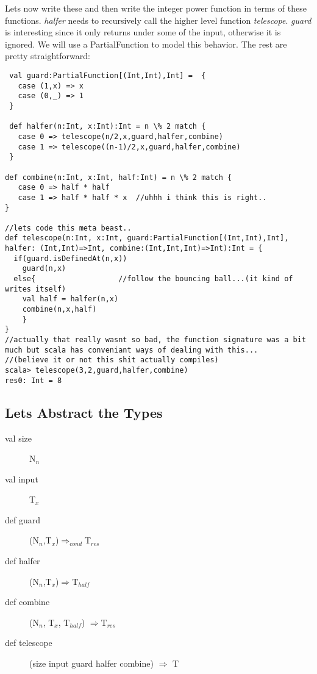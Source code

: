 \documentclass[12pt]{article}
\begin{document}
Lets now write these and then write the integer power function in terms of these functions. \textit{halfer} needs to recursively call the higher level function \textit{telescope}.
\textit{guard} is interesting since it only returns under some of the input, otherwise it is ignored. We will use a PartialFunction to model this behavior. The rest are pretty straightforward:
\begin{lstlisting}
 val guard:PartialFunction[(Int,Int),Int] =  {
   case (1,x) => x
   case (0,_) => 1
 }

 def halfer(n:Int, x:Int):Int = n \% 2 match {
   case 0 => telescope(n/2,x,guard,halfer,combine)
   case 1 => telescope((n-1)/2,x,guard,halfer,combine)
 } 

def combine(n:Int, x:Int, half:Int) = n \% 2 match {
   case 0 => half * half
   case 1 => half * half * x  //uhhh i think this is right..
}

//lets code this meta beast..
def telescope(n:Int, x:Int, guard:PartialFunction[(Int,Int),Int], halfer: (Int,Int)=>Int, combine:(Int,Int,Int)=>Int):Int = {
  if(guard.isDefinedAt(n,x))
    guard(n,x)
  else{                   //follow the bouncing ball...(it kind of writes itself)
    val half = halfer(n,x)
    combine(n,x,half)
    }
}
//actually that really wasnt so bad, the function signature was a bit much but scala has conveniant ways of dealing with this...
//(believe it or not this shit actually compiles)
scala> telescope(3,2,guard,halfer,combine)
res0: Int = 8
\end{lstlisting}

\subsection{Lets Abstract the Types}
\begin{description}
\item[val size]   N$_{n}$
\item[val input]  T$_{x}$
\item[def guard]  (N$_{n}$,T$_{x}$)$\Rightarrow_{cond}$T$_{res}$
\item[def halfer] (N$_{n}$,T$_{x}$)$\Rightarrow$T$_{half}$
\item[def combine] (N$_{n}$, T$_{x}$, T$_{half}$) $\Rightarrow$T$_{res}$
\item[def telescope] (size input guard halfer combine) $\Rightarrow$ T
\end{description}
\end{document}

